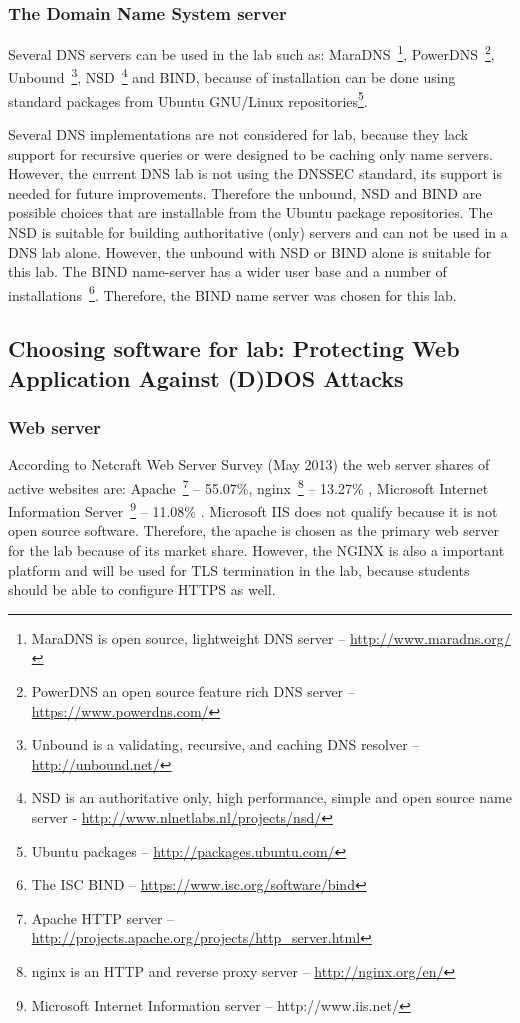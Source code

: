 \subsubsection{The Domain Name System server}
Several \gls{DNS} servers can be used in the lab such as: MaraDNS~\footnote{ MaraDNS is open source, lightweight \gls{DNS} server -- \url{http://www.maradns.org/}}, PowerDNS~\footnote{PowerDNS an open source feature rich \gls{DNS} server -- \url{https://www.powerdns.com/}}, Unbound~\footnote{Unbound is a validating, recursive, and caching \gls{DNS} resolver -- \url{http://unbound.net/}}, NSD~\footnote{NSD is an authoritative only, high performance, simple and open source name server - \url{http://www.nlnetlabs.nl/projects/nsd/}} and \gls{BIND}, because of installation can be done using standard packages from Ubuntu GNU/Linux repositories\footnote{Ubuntu packages --  \url{http://packages.ubuntu.com/}}.

Several \gls{DNS} implementations are not considered for lab, because they lack support for recursive queries or  were designed to be caching only name servers. However, the current \gls{DNS} lab is not using the \gls{DNSSEC} standard, its support is needed for future improvements. Therefore the unbound, NSD and \gls{BIND} are possible choices that are installable from the Ubuntu package repositories. The NSD is suitable for building authoritative (only) servers and can not be used in a \gls{DNS} lab alone.
However, the unbound with NSD or \gls{BIND} alone is suitable for this lab. The \gls{BIND} name-server has a wider user base and a number of installations~\footnote{The \gls{ISC} \gls{BIND} -- \url{https://www.isc.org/software/bind}}. Therefore, the \gls{BIND} name server was chosen for this lab.


\subsection{Choosing software for lab: Protecting Web Application Against (D)DOS Attacks}

\subsubsection{Web server}
According to Netcraft Web Server Survey (May 2013) the web server shares of active websites are: Apache~\footnote{Apache \gls{HTTP} server -- \url{http://projects.apache.org/projects/http_server.html}} -- 55.07\%,  nginx~\footnote{nginx is an HTTP and reverse proxy server -- \url{http://nginx.org/en/}} -- 13.27\%	, Microsoft Internet Information Server~\footnote{Microsoft Internet Information server -- http://www.iis.net/} -- 11.08\% \citep{website:netcraft_web}. Microsoft IIS does not qualify because it is not open source software.  Therefore, the apache is chosen as the primary web server for the lab because of its market share. However, the NGINX is also a important platform and will be used for \gls{TLS} termination in the lab, because students should be able to configure \gls{HTTPS} as well.

